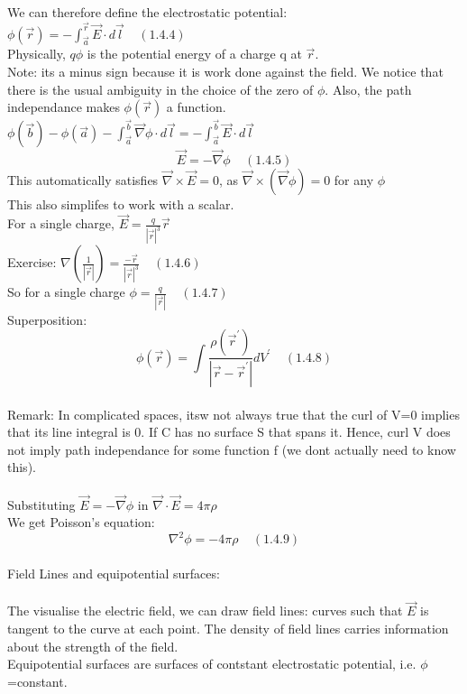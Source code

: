 \documentclass[a4paper,11pt]{article}
\begin{document}
We can therefore define the electrostatic potential:\\
$\phi(\vec{r})=-\int ^{\vec{r}} _{\vec{a}} \vec{E} \cdot d\vec{l}~~~~~(1.4.4)$\\
Physically, $q\phi$ is the potential energy of a charge q at $\vec{r}$.\\
Note: its a minus sign because it is work done against the field. We notice that there is the usual ambiguity in the choice of the zero of $\phi$. Also, the path independance makes $\phi(\vec{r})$ a function.\\
$\phi(\vec{b})-\phi(\vec{a})-\int^{\vec{b}} _{\vec{a}} \vec{\nabla}\phi \cdot d\vec{l} = -\int^{\vec{b}} _{\vec{a}} \vec{E} \cdot d\vec{l}$\\
$$\vec{E}=-\vec{\nabla}\phi~~~~~(1.4.5)$$
This automatically satisfies $\vec{\nabla}\times \vec{E}=0$, as $\vec{\nabla}\times(\vec{\nabla} \phi)=0$ for any $\phi$\\
This also simplifes to work with a scalar.\\
For a single charge, $\vec{E} = \frac{q}{|\vec{r}|^3}\vec{r}$\\
Exercise: $\nabla(\frac{1}{|\vec{r}|}) = \frac{-\vec{r}}{|\vec{r}|^3}~~~~~(1.4.6)$\\
So for a single charge $\phi=\frac{q}{|\vec{r}|}~~~~~(1.4.7)$\\
Superposition:
$$\phi(\vec{r})=\int \dfrac{\rho(\vec{r}^{'})}{|\vec{r}-\vec{r}^{'}|} dV^{'}~~~~~(1.4.8)$$\\
Remark: In complicated spaces, itsw not always true that the curl of V=0 implies that its line integral is 0. If C has no surface S that spans it.
Hence, curl V does not imply path independance for some function f (we dont actually need to know this).\\
\\
Substituting $\vec{E}=-\vec{\nabla} \phi$ in $\vec{\nabla} \cdot \vec{E} =4\pi \rho$\\
We get Poisson's equation:
$$\nabla ^2 \phi = -4\pi\rho~~~~~(1.4.9)$$
\\
Field Lines and equipotential surfaces:\\
\\
The visualise the electric field, we can draw field lines: curves such that $\vec{E}$ is tangent to the curve at each point. The density of field lines carries information about the strength of the field.\\
Equipotential surfaces are surfaces of contstant electrostatic potential, i.e. $\phi$=constant.\\
\end{document}
